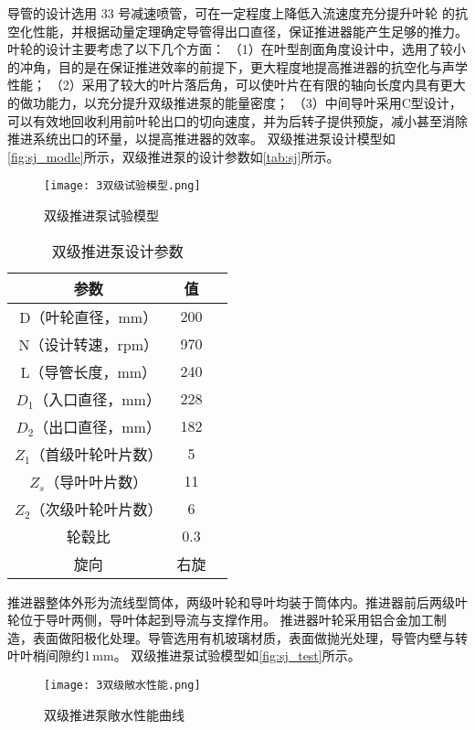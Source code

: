 导管的设计选用 33 号减速喷管，可在一定程度上降低入流速度充分提升叶轮
的抗空化性能，并根据动量定理确定导管得出口直径，保证推进器能产生足够的推力。
叶轮的设计主要考虑了以下几个方面：
（1）在叶型剖面角度设计中，选用了较小的冲角，目的是在保证推进效率的前提下，更大程度地提高推进器的抗空化与声学性能；
（2）采用了较大的叶片落后角，可以使叶片在有限的轴向长度内具有更大的做功能力，以充分提升双级推进泵的能量密度；
（3）中间导叶采用C型设计，可以有效地回收利用前叶轮出口的切向速度，并为后转子提供预旋，减小甚至消除推进系统出口的环量，以提高推进器的效率。
双级推进泵设计模型如\autoref{fig:sj_modle}所示，双级推进泵的设计参数如\autoref{tab:sj}所示。
\begin{figure}[htbp]
    \centering
    \texttt{[image: 3双级试验模型.png]}
    \caption{\label{fig:sj_test}双级推进泵试验模型}
\end{figure}

\begin{table}[htbp]
    \centering
    \caption{\label{tab:sj}双级推进泵设计参数}
    \begin{tabular}{ccc}
     \toprule
     参数&值\\
     \midrule
     D（叶轮直径，mm）&200\\
     N（设计转速，rpm）&970\\
     L（导管长度，mm）&240\\
     $D_1$（入口直径，mm）&228\\
     $D_2$（出口直径，mm）&182\\
     $Z_1$（首级叶轮叶片数）&5\\
     $Z_s$（导叶叶片数）&11\\
     $Z_2$（次级叶轮叶片数）&6\\
     轮毂比&0.3\\
     旋向&右旋\\
     \bottomrule
    \end{tabular}
\end{table}

推进器整体外形为流线型筒体，两级叶轮和导叶均装于筒体内。推进器前后两级叶轮位于导叶两侧，导叶体起到导流与支撑作用。
推进器叶轮采用铝合金加工制造，表面做阳极化处理。导管选用有机玻璃材质，表面做抛光处理，导管内壁与转叶叶梢间隙约1\,mm。
双级推进泵试验模型如\autoref{fig:sj_test}所示。
\begin{figure}[htbp]
    \centering
    \texttt{[image: 3双级敞水性能.png]}
    \caption{\label{fig:sj_changshui}双级推进泵敞水性能曲线}
\end{figure}

